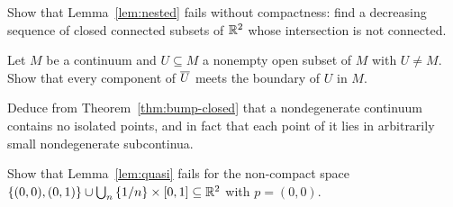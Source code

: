 \begin{exercise}
Show that Lemma~\ref{lem:nested} fails without compactness: find a decreasing sequence of closed
connected subsets of $\mathbb{R}^2$ whose intersection is not connected.
\end{exercise}

\begin{exercise}
Let $M$ be a continuum and $U\subseteq M$ a nonempty open subset of $M$ with $U\neq M$. Show that every
component of $\overline{U}$ meets the boundary of $U$ in $M$.
\end{exercise}

\begin{exercise}
Deduce from Theorem~\ref{thm:bump-closed} that a nondegenerate continuum contains no isolated
points, and in fact that each point of it lies in arbitrarily small nondegenerate subcontinua.
\end{exercise}

\begin{exercise}
Show that Lemma~\ref{lem:quasi} fails for the non-compact space $\left\{ (0,0),(0,1) \right\}\cup\bigcup_n
\left\{ 1/n \right\}\times[0,1]\subseteq\mathbb{R}^2$ with $p=(0,0)$.
\end{exercise}
